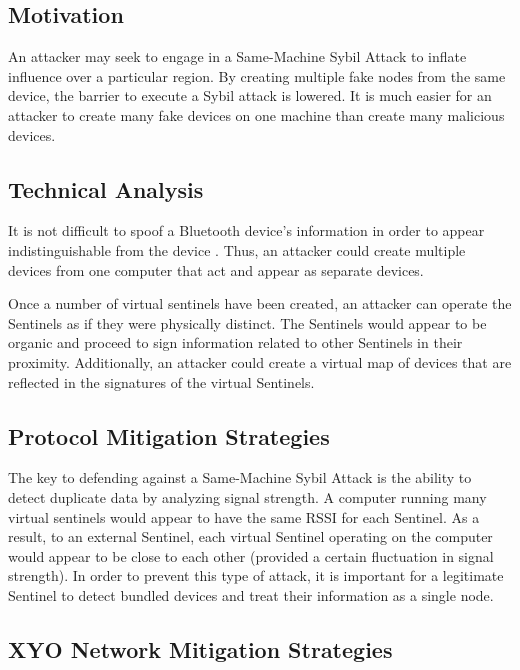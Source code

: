 \documentclass{article}
\begin{document}
\subsection{Motivation}

An attacker may seek to engage in a Same-Machine Sybil Attack to inflate influence over a particular region. By creating multiple fake nodes from the same device, the barrier to execute a Sybil attack is lowered. It is much easier for an attacker to create many fake devices on one machine than create many malicious devices.

\subsection{Technical Analysis}

It is not difficult to spoof a Bluetooth device's information in order to appear indistinguishable from the device \cite{haxf4rall-bluetooth}. Thus, an attacker could create multiple devices from one computer that act and appear as separate devices.

Once a number of virtual \Glspl{sentinel} have been created, an attacker can operate the Sentinels as if they were physically distinct. The Sentinels would appear to be organic and proceed to sign information related to other Sentinels in their proximity. Additionally, an attacker could create a virtual map of devices that are reflected in the signatures of the virtual Sentinels.

\subsection{Protocol Mitigation Strategies}

The key to defending against a Same-Machine Sybil Attack is the ability to detect duplicate data by analyzing signal strength. A computer running many virtual \Glspl{sentinel} would appear to have the same RSSI for each Sentinel. As a result, to an external Sentinel, each virtual Sentinel operating on the computer would appear to be close to each other (provided a certain fluctuation in signal strength). In order to prevent this type of attack, it is important for a legitimate Sentinel to detect bundled devices and treat their information as a single node.

\subsection{XYO Network Mitigation Strategies}
\end{document}
